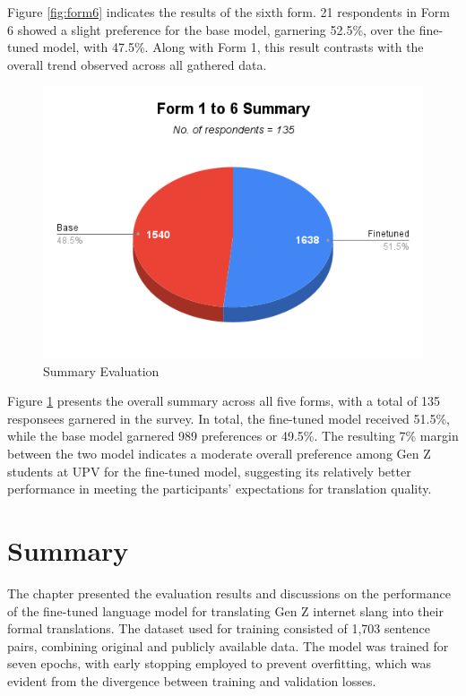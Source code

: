 Figure \ref{fig:form6} indicates the results of the sixth form. 21 respondents in Form 6 showed a slight preference for the base model, garnering 52.5\%, over the fine-tuned model, with 47.5\%. Along with Form 1, this result contrasts with the overall trend observed across all gathered data.  

\begin{figure}[htbp]
	\centering
	\includegraphics[scale=0.7]{figures/Summary.png}
	\caption{Summary Evaluation}
	\label{fig:summary}	
\end{figure}

Figure \ref{fig:summary} presents the overall summary across all five forms, with a total of 135 responsees garnered in the survey. In total, the fine-tuned model received 51.5\%, while the base model garnered 989 preferences or 49.5\%. The resulting 7\% margin between the two model indicates a moderate overall preference among Gen Z students at UPV for the fine-tuned model, suggesting its relatively better performance in meeting the participants' expectations for translation quality. 

\section{Summary}
The chapter presented the evaluation results and discussions on the performance of the fine-tuned language model for translating Gen Z internet slang into their formal translations. The dataset used for training consisted of 1,703 sentence pairs, combining original and publicly available data. The model was trained for seven epochs, with early stopping employed to prevent overfitting, which was evident from the divergence between training and validation losses.

